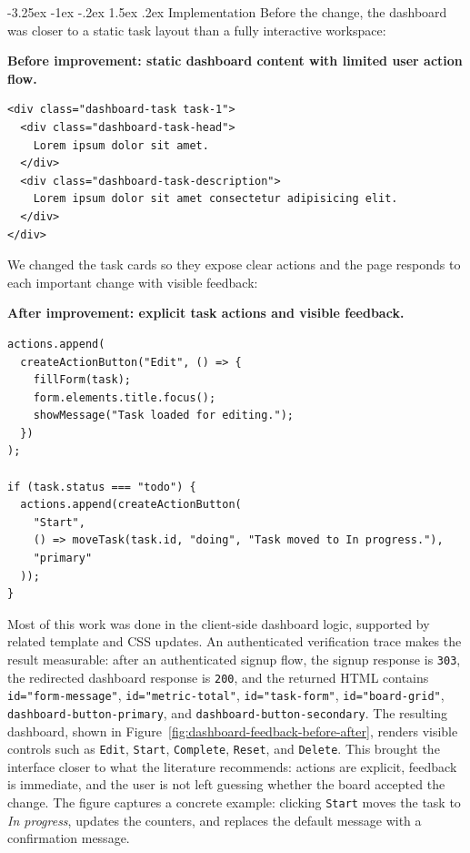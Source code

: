 ﻿\documentclass[12pt,a4paper]{article}
\makeatletter
\renewcommand\subsection{\@startsection{subsection}{2}{\z@}%
  {-3.25ex \@plus -1ex \@minus -.2ex}%
  {1.5ex \@plus .2ex}%
  {\normalfont\bfseries\fontsize{12}{14}\selectfont}}
\makeatother
\begin{document}
\subsection{Implementation}
Before the change, the dashboard was closer to a static task layout than a fully
interactive workspace:

\noindent\textbf{Before improvement: static dashboard content with limited user action flow.}
{\footnotesize
\begin{verbatim}
<div class="dashboard-task task-1">
  <div class="dashboard-task-head">
    Lorem ipsum dolor sit amet.
  </div>
  <div class="dashboard-task-description">
    Lorem ipsum dolor sit amet consectetur adipisicing elit.
  </div>
</div>
\end{verbatim}
}

We changed the task cards so they expose clear actions and the page responds to
each important change with visible feedback:

\noindent\textbf{After improvement: explicit task actions and visible feedback.}
{\footnotesize
\begin{verbatim}
actions.append(
  createActionButton("Edit", () => {
    fillForm(task);
    form.elements.title.focus();
    showMessage("Task loaded for editing.");
  })
);

if (task.status === "todo") {
  actions.append(createActionButton(
    "Start",
    () => moveTask(task.id, "doing", "Task moved to In progress."),
    "primary"
  ));
}
\end{verbatim}
}

Most of this work was done in the client-side dashboard logic, supported by
related template and CSS updates. An authenticated verification trace makes the
result measurable: after an authenticated signup flow, the signup response is
\texttt{303}, the redirected dashboard response is \texttt{200}, and the
returned HTML contains \texttt{id="form-message"},
\texttt{id="metric-total"}, \texttt{id="task-form"}, \texttt{id="board-grid"},
\texttt{dashboard-button-primary}, and
\texttt{dashboard-button-secondary}. The resulting dashboard, shown in
Figure~\ref{fig:dashboard-feedback-before-after}, renders visible controls such
as \texttt{Edit}, \texttt{Start}, \texttt{Complete}, \texttt{Reset}, and
\texttt{Delete}. This brought the interface closer to what the literature
recommends: actions are explicit, feedback is immediate, and the user is not
left guessing whether the board accepted the change. The figure captures a
concrete example: clicking \texttt{Start} moves the task to
\textit{In progress}, updates the counters, and replaces the default message
with a confirmation message.
\end{document}
